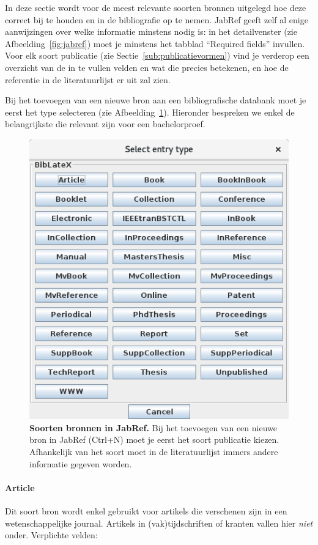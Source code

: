 In deze sectie wordt voor de meest relevante soorten bronnen uitgelegd hoe deze correct bij te houden en in de bibliografie op te nemen. JabRef geeft zelf al enige aanwijzingen over welke informatie minstens nodig is: in het detailvenster (zie Afbeelding~\ref{fig:jabref}) moet je minstens het tabblad ``Required fields'' invullen. Voor elk soort publicatie (zie Sectie~\ref{sub:publicatievormen}) vind je verderop een overzicht van de in te vullen velden en wat die precies betekenen, en hoe de referentie in de literatuurlijst er uit zal zien.

Bij het toevoegen van een nieuwe bron aan een bibliografische databank moet je eerst het type selecteren (zie Afbeelding~\ref{fig:jabref-entrytypes}). Hieronder bespreken we enkel de belangrijkste die relevant zijn voor een bachelorproef.

\begin{figure}
  \centering
  \includegraphics[width=0.6\linewidth]{img/jabref-entrytypes}
  \caption[Soorten bronnen in JabRef]{\textbf{Soorten bronnen in JabRef.} Bij het toevoegen van een nieuwe bron in JabRef (Ctrl+N) moet je eerst het soort publicatie kiezen. Afhankelijk van het soort moet in de literatuurlijst immers andere informatie gegeven worden.}
  \label{fig:jabref-entrytypes}
\end{figure}

\paragraph{Article}

Dit soort bron wordt enkel gebruikt voor artikels die verschenen zijn in een wetenschappelijke journal. Artikels in (vak)tijdschriften of kranten vallen hier \emph{niet} onder. Verplichte velden:


